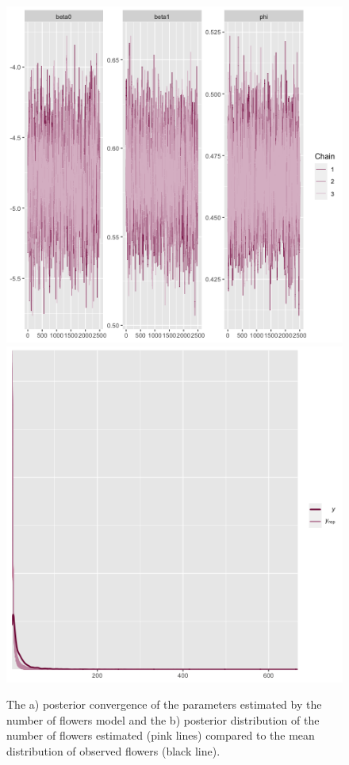 \documentclass[11pt]{article}
\begin{document}
\begin{figure}
	\includegraphics[width = 0.45\linewidth]{Figures/flow_conv.png}
	\includegraphics[width=0.45\linewidth]{Figures/flow_post.png}
	\caption{The a) posterior convergence of the parameters estimated by the number of flowers model and the b) posterior distribution of the number of flowers estimated (pink lines) compared to the mean distribution of observed flowers (black line).}
	\label{fig:Flow_post}
\end{figure}
\end{document}
